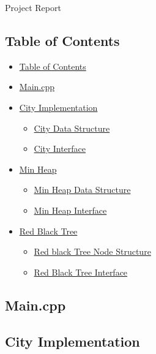 \documentclass[
]{article}
\date{}
\providecommand{\tightlist}{%
  \setlength{\itemsep}{0pt}\setlength{\parskip}{0pt}}
\begin{document}
Project Report

\hypertarget{table-of-contents}{%
\subsection{Table of Contents}\label{table-of-contents}}

\begin{itemize}
\tightlist
\item
  \protect\hyperlink{table-of-contents}{Table of Contents}
\item
  \protect\hyperlink{maincpp}{Main.cpp}
\item
  \protect\hyperlink{city-implementation}{City Implementation}

  \begin{itemize}
  \tightlist
  \item
    \protect\hyperlink{city-data-structure}{City Data Structure}
  \item
    \protect\hyperlink{city-interface}{City Interface}
  \end{itemize}
\item
  \protect\hyperlink{min-heap}{Min Heap}

  \begin{itemize}
  \tightlist
  \item
    \protect\hyperlink{min-heap-data-structure}{Min Heap Data Structure}
  \item
    \protect\hyperlink{min-heap-interface}{Min Heap Interface}
  \end{itemize}
\item
  \protect\hyperlink{red-black-tree}{Red Black Tree}

  \begin{itemize}
  \tightlist
  \item
    \protect\hyperlink{red-black-tree-node-structure}{Red black Tree
    Node Structure}
  \item
    \protect\hyperlink{red-black-tree-interface}{Red Black Tree
    Interface}
  \end{itemize}
\end{itemize}

\hypertarget{main.cpp}{%
\subsection{Main.cpp}\label{main.cpp}}

\hypertarget{city-implementation}{%
\subsection{City Implementation}\label{city-implementation}}
\end{document}
